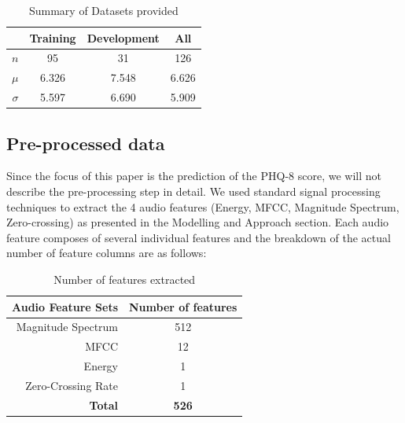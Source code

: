 \documentclass{article}
\begin{document}
 	\begin{table}[h]
 		\begin{center}
  			\begin{tabular}{ | r | c | c | c | }
    			\hline
			 		& \bfseries Training	& \bfseries Development 	& \bfseries All \\ \hline
			 $n$		& 95 			& 31 				& 126 \\ \hline
			 $\mu$	& 6.326 		& 7.548			& 6.626 \\ \hline
			 $\sigma$	& 5.597 		& 6.690 			& 5.909 \\ \hline
			 \end{tabular}
		\end{center}
 	\caption{Summary of Datasets provided}
 	\label{summary_table}
 	\end{table}

	\subsection{Pre-processed data}
	Since the focus of this paper is the prediction of the PHQ-8 score, we will not describe the pre-processing step in detail.
	We used standard signal processing techniques to extract the 4 audio features (Energy, MFCC, Magnitude Spectrum, Zero-crossing) as presented in the Modelling and Approach section.
	Each audio feature composes of several individual features and the breakdown of the actual number of feature columns are as follows:

 	\begin{table}[h]
 		\begin{center}
  			\begin{tabular}{ | r | c | }
    			\hline
			 \bfseries Audio Feature Sets 	& \bfseries Number of features \\ \hline
			 Magnitude Spectrum		& 512 \\ \hline
			 MFCC 				& 12 \\ \hline
			 Energy 				& 1 \\ \hline
			 Zero-Crossing Rate 		& 1 \\ \hline
			 \bfseries Total			& \bfseries 526 \\ \hline
			 \end{tabular}
		\end{center}
 	\caption{Number of features extracted}
 	\label{no_features}
 	\end{table}
\end{document}
